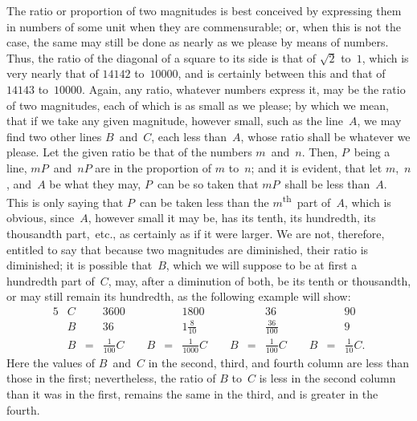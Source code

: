 \documentclass[12pt]{book}[2005/09/16]
\newcommand{\Pagelabel}[1]{\phantomsection\label{page:#1}}
\newcommand{\PageSep}[1]{\Pagelabel{#1}\ignorespaces}
\renewcommand{\th}{\textsuperscript{th}}
\renewcommand{\(}{{\upshape(}}
\renewcommand{\)}{{\upshape)}}
\begin{document}
The ratio or proportion of two magnitudes is best
%
%
conceived by expressing them in numbers of some
unit when they are commensurable; or, when this is
not the case, the same may still be done as nearly as
we please by means of numbers. Thus, the ratio of
the diagonal of a square to its side is that of $\sqrt{2}$ to~$1$,
which is very nearly that of $14142$ to~$10000$, and is
certainly between this and that of $14143$ to~$10000$.
Again, any ratio, whatever numbers express it, may
be the ratio of two magnitudes, each of which is as
small as we please; by which we mean, that if we
take any given magnitude, however small, such as the
line~$A$, we may find two other lines $B$~and~$C$, each
less than~$A$, whose ratio shall be whatever we please.
Let the given ratio be that of the numbers $m$~and~$n$.
Then, $P$~being a line, $mP$~and~$nP$ are in the proportion
of $m$ to~$n$; and it is evident, that let $m$,~$n$, and~$A$
be what they may, $P$~can be so taken that $mP$~shall be
less than~$A$. This is only saying that $P$~can be taken
less than the $m$\th~part of~$A$, which is obvious, since~$A$,
however small it may be, has its tenth, its hundredth,
its thousandth part,~etc., as certainly as if it were
larger. We are not, therefore, entitled to say that
because two magnitudes are diminished, their ratio is
\PageSep{3}
diminished; it is possible that~$B$, which we will suppose
to be at first a hundredth part of~$C$, may, after
a diminution of both, be its tenth or thousandth, or
may still remain its hundredth, as the following example
will show:
\begin{alignat*}{5}
&C && 3600 && 1800 && 36 && 90 \\
&B && 36   && 1\tfrac{8}{10} && \tfrac{36}{100} && 9 \\
&B &{}={}& \frac{1}{100} C\qquad
 B &{}={}& \frac{1}{1000} C\qquad
 B &{}={}& \frac{1}{100} C\qquad
 B &{}={}& \frac{1}{10} C.
\end{alignat*}
Here the values of $B$~and~$C$ in the second, third, and
fourth column are less than those in the first; nevertheless,
the ratio of $B$ to~$C$ is less in the second column
than it was in the first, remains the same in the
third, and is greater in the fourth.
\end{document}
